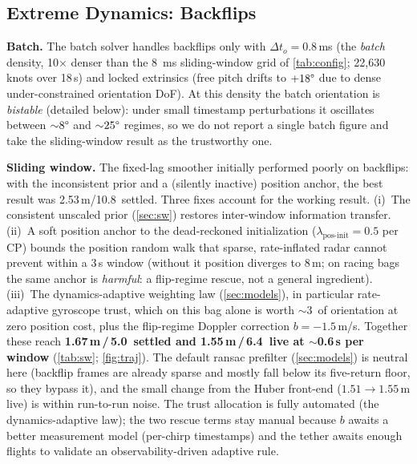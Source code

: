\subsection{Extreme Dynamics: Backflips}
\label{sec:backflips}

\textbf{Batch.}
The batch solver handles backflips only with $\Delta t_o {=} 0.8$\,ms
(the \emph{batch} density, 10$\times$ denser than the \SI{8}{\milli\second}
sliding-window grid of \autoref{tab:config}; 22{,}630 knots over 18\,s) and
locked extrinsics (free pitch drifts to $+18\degree$ due to dense
under-constrained orientation DoF).  At this density the batch
orientation is \emph{bistable} (detailed below): under small
timestamp perturbations it oscillates between ${\sim}8\degree$ and
${\sim}25\degree$ regimes, so we do not report a single batch figure and
take the sliding-window result as the trustworthy one.

\textbf{Sliding window.}
The fixed-lag smoother initially performed poorly on
backflips: with the inconsistent prior and a (silently inactive)
position anchor, the best result was 2.53\,m/10.8\degree\ settled.
Three fixes account for the working result.
(i)~The consistent unscaled prior (\autoref{sec:sw}) restores
inter-window information transfer.
(ii)~A soft position anchor to the dead-reckoned initialization
($\lambda_{\mathrm{pos\text{-}init}}{=}0.5$ per CP) bounds the
position random walk that sparse, rate-inflated radar cannot prevent
within a 3\,s window (without it position diverges to 8\,m; on racing
bags the same anchor is \emph{harmful}: a flip-regime rescue,
not a general ingredient).
(iii)~The dynamics-adaptive weighting law (\autoref{sec:models}),
in particular rate-adaptive gyroscope trust, which on this bag alone
is worth $\sim$3\degree\ of orientation at zero position cost,
plus the flip-regime Doppler correction $b{=}{-}1.5$\,m/s.
Together these reach \textbf{1.67\,m\,/\,5.0\degree\ settled and
1.55\,m\,/\,6.4\degree\ live at $\sim$0.6\,s per window}
(\autoref{tab:sw}; \autoref{fig:traj}).  The default \ac{ransac}
prefilter (\autoref{sec:models})
is neutral here (backflip frames are already sparse and mostly fall
below its five-return floor, so they bypass it), and the small change
from the Huber front-end ($1.51\to1.55$\,m live) is within run-to-run
noise.
The trust allocation is fully automated (the
dynamics-adaptive law); the two rescue terms stay manual because $b$
awaits a better measurement model (per-chirp timestamps) and the tether
awaits enough flights to validate an observability-driven adaptive rule.

